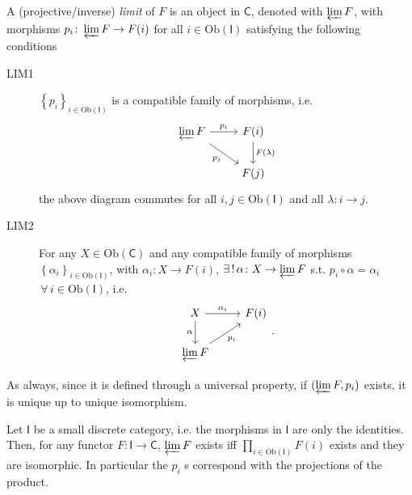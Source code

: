 \begin{defn}
	A (projective/inverse) {\em limit} of $F$ is an object in $\mathsf{C}$, denoted with $\varprojlim F$, with morphisms
	$p_i\colon \varprojlim F \to F(i)$ for all $i \in \mathrm{Ob} \left(\mathsf{I}\right)$ satisfying the following conditions
	\begin{description}
		\item[LIM1] $\left\{ p_i \right\}_{i \in \mathrm{Ob} \left(\mathsf{I}\right)}$ is a compatible family of morphisms, i.e.
			\begin{equation}
			\begin{tikzcd}
				\varprojlim F \arrow[r, "p_i", rightarrow] \arrow[rd, "p_j"', rightarrow] &
				F(i) \arrow[d, "F(\lambda)", rightarrow] \\
				&
				F(j)
			\end{tikzcd}
			\end{equation} 
			the above diagram commutes for all $i, j \in \mathrm{Ob} \left(\mathsf{I}\right)$ and all $\lambda\colon i \to j$.
		\item[LIM2] For any $X \in \mathrm{Ob} \left(\mathsf{C}\right)$ and any compatible family of morphisms $\left\{ \alpha_i \right\}_{i \in \mathrm{Ob} \left(\mathsf{I}\right)}$, with $\alpha_i\colon X \to F(i)$, 
			$\exists\, !\, \alpha\colon X \to \varprojlim F$ s.t. $p_i \circ \alpha = \alpha_i$ $\,\forall\, i \in \mathrm{Ob} \left(\mathsf{I}\right)$, i.e.
			\begin{equation}
			\begin{tikzcd}
				X \arrow[r, "\alpha_i", rightarrow] \arrow[d, "\alpha"', rightarrow] &
				F(i)\\
				\varprojlim F \arrow[ru, "p_i"', rightarrow]  
			\end{tikzcd}
			.\end{equation} 
	\end{description} 
\end{defn}

\begin{rem}
	As always, since it is defined through a universal property, if $(\varprojlim F, p_i)$ exists, it is unique up to unique isomorphism.
\end{rem}

\begin{ex}
	Let $\mathsf{I}$ be a small discrete category, i.e. the morphisms in $\mathsf{I}$ are only the identities.
	Then, for any functor $F\colon \mathsf{I} \to \mathsf{C}$, $\varprojlim F$ exists iff 
	$\prod_{i \in \mathrm{Ob} \left(\mathsf{I}\right)} F(i)$ exists and they are isomorphic.
	In particular the $p_i$ s correspond with the projections of the product.
\end{ex} 

